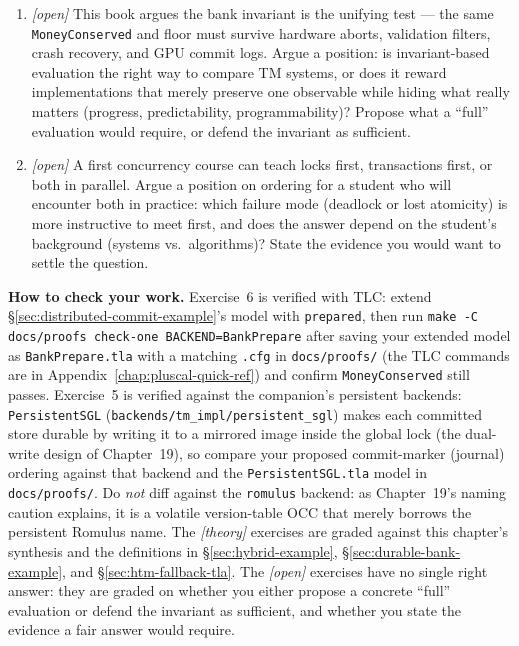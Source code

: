 \begin{enumerate}
    \item \emph{[open]} This book argues the bank invariant is the unifying
          test --- the same \texttt{MoneyConserved} and floor must survive
          hardware aborts, validation filters, crash recovery, and GPU
          commit logs.  Argue a position: is invariant-based evaluation the
          right way to compare TM systems, or does it reward implementations
          that merely preserve one observable while hiding what really
          matters (progress, predictability, programmability)?  Propose
          what a ``full'' evaluation would require, or defend the invariant
          as sufficient.
    \item \emph{[open]} A first concurrency course can teach locks first,
          transactions first, or both in parallel.  Argue a position on
          ordering for a student who will encounter both in practice:
          which failure mode (deadlock or lost atomicity) is more
          instructive to meet first, and does the answer depend on the
          student's background (systems vs.\ algorithms)?  State the
          evidence you would want to settle the question.
\end{enumerate}

\textbf{How to check your work.} Exercise~6 is verified with TLC: extend
\S\ref{sec:distributed-commit-example}'s model with \texttt{prepared},
then run \texttt{make -C docs/proofs check-one BACKEND=BankPrepare} after
saving your extended model as \texttt{BankPrepare.tla} with a matching
\texttt{.cfg} in \texttt{docs/proofs/} (the TLC commands are in
Appendix~\ref{chap:pluscal-quick-ref}) and confirm
\texttt{MoneyConserved} still passes.  Exercise~5 is verified against the
companion's persistent backends: \texttt{PersistentSGL}
(\texttt{backends/tm\_impl/persistent\_sgl}) makes each committed store
durable by writing it to a mirrored image inside the global lock (the
dual-write design of Chapter~19), so compare your proposed commit-marker
(journal) ordering against that backend and the \texttt{PersistentSGL.tla}
model in \texttt{docs/proofs/}.  Do \emph{not} diff against the
\texttt{romulus} backend: as Chapter~19's naming caution explains, it is a
volatile version-table OCC that merely borrows the persistent Romulus name.  The \emph{[theory]} exercises are
graded against this chapter's synthesis and the definitions in
\S\ref{sec:hybrid-example}, \S\ref{sec:durable-bank-example}, and
\S\ref{sec:htm-fallback-tla}.  The \emph{[open]} exercises have no single
right answer: they are graded on whether you either propose a concrete
``full'' evaluation or defend the invariant as sufficient, and whether
you state the evidence a fair answer would require.

